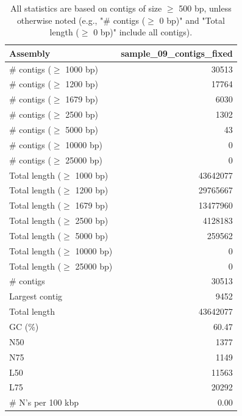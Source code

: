 \documentclass[12pt,a4paper]{article}
\begin{document}
\begin{table}[ht]
\begin{center}
\caption{All statistics are based on contigs of size $\geq$ 500 bp, unless otherwise noted (e.g., "\# contigs ($\geq$ 0 bp)" and "Total length ($\geq$ 0 bp)" include all contigs).}
\begin{tabular}{|l*{1}{|r}|}
\hline
Assembly & sample\_09\_contigs\_fixed \\ \hline
\# contigs ($\geq$ 1000 bp) & 30513 \\ \hline
\# contigs ($\geq$ 1200 bp) & 17764 \\ \hline
\# contigs ($\geq$ 1679 bp) & 6030 \\ \hline
\# contigs ($\geq$ 2500 bp) & 1302 \\ \hline
\# contigs ($\geq$ 5000 bp) & 43 \\ \hline
\# contigs ($\geq$ 10000 bp) & 0 \\ \hline
\# contigs ($\geq$ 25000 bp) & 0 \\ \hline
Total length ($\geq$ 1000 bp) & 43642077 \\ \hline
Total length ($\geq$ 1200 bp) & 29765667 \\ \hline
Total length ($\geq$ 1679 bp) & 13477960 \\ \hline
Total length ($\geq$ 2500 bp) & 4128183 \\ \hline
Total length ($\geq$ 5000 bp) & 259562 \\ \hline
Total length ($\geq$ 10000 bp) & 0 \\ \hline
Total length ($\geq$ 25000 bp) & 0 \\ \hline
\# contigs & 30513 \\ \hline
Largest contig & 9452 \\ \hline
Total length & 43642077 \\ \hline
GC (\%) & 60.47 \\ \hline
N50 & 1377 \\ \hline
N75 & 1149 \\ \hline
L50 & 11563 \\ \hline
L75 & 20292 \\ \hline
\# N's per 100 kbp & 0.00 \\ \hline
\end{tabular}
\end{center}
\end{table}
\end{document}
